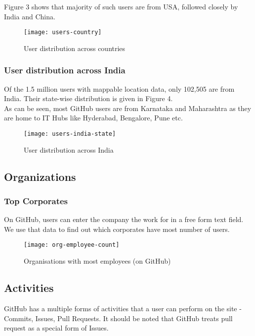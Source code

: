 Figure 3 shows that majority of such users are from USA, followed closely by India and China.


\begin{figure}[htb]
\centering
\texttt{[image: users-country]}
\caption{User distribution across countries}
\end{figure}

\subsubsection{User distribution across India}

Of the 1.5 million users with mappable location data, only 102,505 are from India.
Their state-wise distribution is given in Figure 4. \\

As can be seen, most GitHub users are from Karnataka and Maharashtra as they are home to
IT Hubs like Hyderabad, Bengalore, Pune etc.

\begin{figure}[htb]
\centering
\texttt{[image: users-india-state]}
\caption{User distribution across India}
\end{figure}

\subsection{Organizations}

\subsubsection{Top Corporates}

On GitHub, users can enter the company the work for in a free form text field.
We use that data to find out which corporates have most number of users.


\begin{figure}[htb]
\centering
\texttt{[image: org-employee-count]}
\caption{Organisations with most employees (on GitHub)}
\end{figure}

\newpage
\subsection{Activities}

GitHub has a multiple forms of activities that a user can perform on the site - Commits, Issues, Pull Requests.
It should be noted that GitHub treats pull request as a special form of Issues. \\

